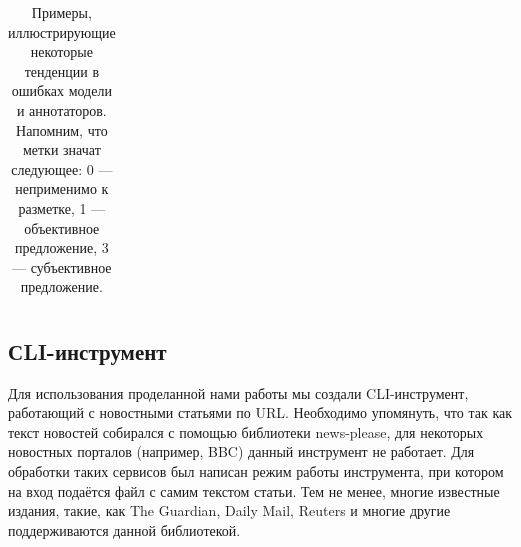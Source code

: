 \documentclass[a4paper,14pt]{extarticle}
\begin{document}
\begin{table}[h!]
\begin{center}
\begin{tabular}{|l|c|c|l|}
            \end{tabular}
            \caption{Примеры, иллюстрирующие некоторые тенденции в ошибках модели и аннотаторов. Напомним, что метки значат следующее: 0 --- неприменимо к разметке, 1 --- объективное предложение, 3 --- субъективное предложение.}
            \label{tab:error-analysis}    
        \end{center}
    \end{table}
    \subsection{СLI-инструмент}
    Для использования проделанной нами работы мы создали CLI-инструмент, работающий с новостными статьями по URL. Необходимо упомянуть, что так как текст новостей собирался с помощью библиотеки news-please, для некоторых новостных порталов (например, BBC) данный инструмент не работает. Для обработки таких сервисов был написан режим работы инструмента, при котором на вход подаётся файл с самим текстом статьи. Тем не менее, многие известные издания, такие, как The Guardian, Daily Mail, Reuters и многие другие поддерживаются данной библиотекой. 
    
\end{document}
